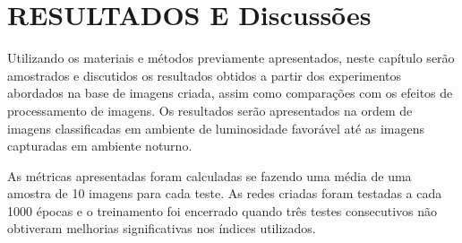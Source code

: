 \chapter{RESULTADOS E Discussões}\label{ch:intro}
Utilizando os materiais e métodos previamente apresentados, neste capítulo serão
amostrados e discutidos os resultados obtidos a partir dos experimentos abordados na base de imagens criada, assim como comparações com os efeitos de processamento de imagens. Os resultados serão apresentados na ordem de imagens classificadas em ambiente de luminosidade favorável até as imagens capturadas em ambiente noturno.


As métricas apresentadas foram calculadas se fazendo uma média de uma amostra de
10 imagens para cada teste. As redes criadas foram testadas a cada 1000 épocas e
o treinamento foi encerrado quando três testes consecutivos não obtiveram melhorias
significativas nos índices utilizados.